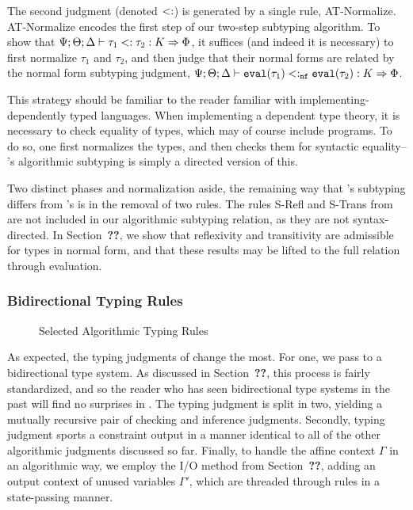 The second judgment (denoted $<:$) is generated by a single rule, AT-Normalize. AT-Normalize encodes the first step of our two-step subtyping algorithm.
To show that $\Psi ; \Theta ; \Delta \vdash \tau_1 <: \tau_2 : K \Rightarrow \Phi$, it suffices (and indeed it is necessary) to first normalize $\tau_1$ and $\tau_2$, and then judge that their normal forms are related by the normal form subtyping judgment, $\Psi ; \Theta ; \Delta \vdash \texttt{eval}(\tau_1) <:_{\texttt{nf}} \texttt{eval}(\tau_2) : K \Rightarrow \Phi$.
 
This strategy should be familiar to the reader familiar with implementing-dependently typed languages. When implementing a dependent type theory, it is necessary to check equality of types, which may of course include programs. To do so, one first normalizes the types, and then checks them for syntactic equality-- \bilambdaamor's algorithmic subtyping is simply a directed version of this.

Two distinct phases and normalization aside, the remaining way that \bilambdaamor's subtyping differs from \dlambdaamor's is in the removal of two rules. The rules S-Refl and S-Trans from \dlambdaamor are not included in our algorithmic subtyping relation, as they are not syntax-directed. In Section~\textbf{??}, we show that reflexivity and transitivity are admissible for types in normal form, and that these results may be lifted to the full relation through evaluation.


\subsubsection{Bidirectional Typing Rules}

\begin{figure}

\caption{Selected Algorithmic Typing Rules}
\label{fig:bilambdaamor-selected-typing-rules}
\end{figure}

As expected, the typing judgments of \bilambdaamor change the most. For one, we pass to a bidirectional type system. As discussed in Section~\textbf{??}, this process is fairly standardized, and so the reader who has seen bidirectional type systems in the past will find no surprises in \bilambdaamor. The typing judgment is split in two, yielding a mutually recursive pair of checking and inference judgments. Secondly, typing judgment sports a constraint output in a manner identical to all of the other algorithmic judgments discussed so far. Finally, to handle the affine context $\Gamma$ in an algorithmic way, we employ the I/O method from Section~\textbf{??}, adding an output context of unused variables $\Gamma'$, which are threaded through rules in a state-passing manner.

